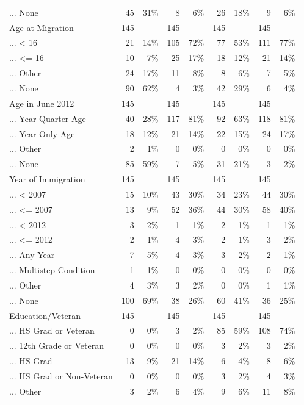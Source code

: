 \documentclass[
  letterpaper,
  DIV=11,
  numbers=noendperiod]{scrartcl}
\begin{document}
\begin{table}[!htbp]
{\begin{tabular}{lrrrrrrrr}
... None & 45 & 31\% & 8 & 6\% & 26 & 18\% & 9 & 6\% \\ 
Age at Migration & 145 &  & 145 &  & 145 &  & 145 &  \\ 
... < 16 & 21 & 14\% & 105 & 72\% & 77 & 53\% & 111 & 77\% \\ 
... <= 16 & 10 & 7\% & 25 & 17\% & 18 & 12\% & 21 & 14\% \\ 
... Other & 24 & 17\% & 11 & 8\% & 8 & 6\% & 7 & 5\% \\ 
... None & 90 & 62\% & 4 & 3\% & 42 & 29\% & 6 & 4\% \\ 
Age in June 2012 & 145 &  & 145 &  & 145 &  & 145 &  \\ 
... Year-Quarter Age & 40 & 28\% & 117 & 81\% & 92 & 63\% & 118 & 81\% \\ 
... Year-Only Age & 18 & 12\% & 21 & 14\% & 22 & 15\% & 24 & 17\% \\ 
... Other & 2 & 1\% & 0 & 0\% & 0 & 0\% & 0 & 0\% \\ 
... None & 85 & 59\% & 7 & 5\% & 31 & 21\% & 3 & 2\% \\ 
Year of Immigration & 145 &  & 145 &  & 145 &  & 145 &  \\ 
... < 2007 & 15 & 10\% & 43 & 30\% & 34 & 23\% & 44 & 30\% \\ 
... <= 2007 & 13 & 9\% & 52 & 36\% & 44 & 30\% & 58 & 40\% \\ 
... < 2012 & 3 & 2\% & 1 & 1\% & 2 & 1\% & 1 & 1\% \\ 
... <= 2012 & 2 & 1\% & 4 & 3\% & 2 & 1\% & 3 & 2\% \\ 
... Any Year & 7 & 5\% & 4 & 3\% & 3 & 2\% & 2 & 1\% \\ 
... Multistep Condition & 1 & 1\% & 0 & 0\% & 0 & 0\% & 0 & 0\% \\ 
... Other & 4 & 3\% & 3 & 2\% & 0 & 0\% & 1 & 1\% \\ 
... None & 100 & 69\% & 38 & 26\% & 60 & 41\% & 36 & 25\% \\ 
Education/Veteran & 145 &  & 145 &  & 145 &  & 145 &  \\ 
... HS Grad or Veteran & 0 & 0\% & 3 & 2\% & 85 & 59\% & 108 & 74\% \\ 
... 12th Grade or Veteran & 0 & 0\% & 0 & 0\% & 3 & 2\% & 3 & 2\% \\ 
... HS Grad & 13 & 9\% & 21 & 14\% & 6 & 4\% & 8 & 6\% \\ 
... HS Grad or Non-Veteran & 0 & 0\% & 0 & 0\% & 3 & 2\% & 4 & 3\% \\ 
... Other & 3 & 2\% & 6 & 4\% & 9 & 6\% & 11 & 8\% \\ 

\end{tabular}}
\end{table}
\end{document}
